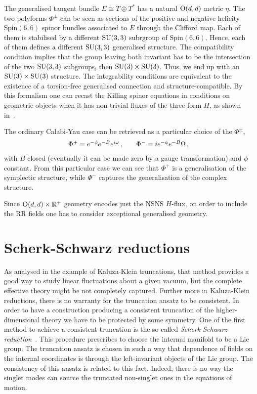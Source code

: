 \documentclass[debug]{phd}
\begin{document}
				The generalised tangent bundle $E \cong T \oplus T^*$ has a natural $\mathrm{O}(d,d)$ metric $\eta$.
				The two polyforms $\Phi^{\pm}$ can be seen as sections of the positive and negative helicity $\mathrm{Spin}(6, 6)$ spinor bundles associated to $E$ through the Clifford map.
				Each of them is stabilised by a different $\mathrm{SU}(3,3)$ subrgroup of $\mathrm{Spin}(6, 6)$.
				Hence, each of them defines a different $\mathrm{SU}(3,3)$ generalised structure. The compatibility condition implies that the group leaving both invariant has to be the intersection of the two $\mathrm{SU}(3,3)$ subgroups, then $\mathrm{SU}(3) \times \mathrm{SU}(3)$.
				Thus, we end up with an $\mathrm{SU}(3) \times \mathrm{SU}(3)$ structure.
				The integrability conditions are equivalent to the existence of a torsion-free generalised connection and structure-compatible.
				By this formalism one can recast the Killing spinor equations in conditions on geometric objects when it has non-trivial fluxes of the three-form $H$, as shown in~\cite{petrini1,petrini2}.
				
				The ordinary Calabi-Yau case can be retrieved as a particular choice of the $\Phi^{\pm}$, 
						\begin{equation}
							\begin{array}{l c c r}
								\Phi^+ = e^{-\phi} e^{-B} e^{i\omega} \, , & & \Phi^- = i e^{-\phi} e^{-B} \Omega \, ,
							\end{array}
						\end{equation}
				with $B$ closed (eventually it can be made zero by a gauge transformation) and $\phi$ constant.
				From this particular case we can see that $\Phi^+$ is a generalisation of the symplectic structure, while $\Phi^-$ captures the generalisation of the complex structure.
				
				Since $\mathrm{O}(d,d)\times \mathbb{R}^+$ geometry encodes just the NSNS $H$-flux, on order to include the RR fields one has to consider exceptional generalised geometry.
		\section{Scherk-Schwarz reductions}
				As analysed in the example of Kaluza-Klein truncations, that method provides a good way to study linear fluctuations about a given vacuum, but the complete effective theory might be not completely captured.
				Further more in Kaluza-Klein reductions, there is no warranty for the truncation ansatz to be consistent.
				In order to have a construction producing a consistent truncation of the higher-dimensional theory we have to be protected by some symmetry.
				One of the first method to achieve a consistent truncation is the so-called \emph{Scherk-Schwarz reduction}~\cite{Scherk:1979zr}.
				This procedure prescribes to choose the internal manifold to be a Lie group.
				The truncation ansatz is chosen in such a way that dependence of fields on the internal coordinates is through the left-invariant objects of the Lie group.
				The consistency of this ansatz is related to this fact.
				Indeed, there is no way the singlet modes can source the truncated non-singlet ones in the equations of motion.
				
\end{document}
